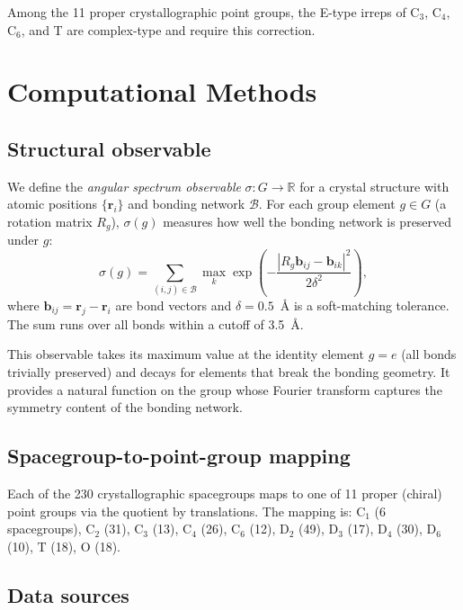 \documentclass[aps,prb,twocolumn,superscriptaddress]{revtex4-2}
\newcommand{\RR}{\mathbb{R}}
\begin{document}
Among the 11 proper crystallographic point groups, the E-type irreps
of C$_3$, C$_4$, C$_6$, and T are complex-type and require this
correction.

\section{Computational Methods}
\label{sec:methods}

\subsection{Structural observable}

We define the \emph{angular spectrum observable} $\sigma : G \to \RR$
for a crystal structure with atomic positions
$\{\mathbf{r}_i\}$ and bonding network $\mathcal{B}$. For each group
element $g \in G$ (a rotation matrix $R_g$), $\sigma(g)$ measures
how well the bonding network is preserved under $g$:
\begin{equation}
  \sigma(g) = \sum_{(i,j) \in \mathcal{B}} \max_k
    \exp\!\left(-\frac{|R_g \mathbf{b}_{ij} - \mathbf{b}_{ik}|^2}{2\delta^2}\right),
\end{equation}
where $\mathbf{b}_{ij} = \mathbf{r}_j - \mathbf{r}_i$ are bond
vectors and $\delta = 0.5$~\AA{} is a soft-matching tolerance. The
sum runs over all bonds within a cutoff of 3.5~\AA.

This observable takes its maximum value at the identity element
$g = e$ (all bonds trivially preserved) and decays for elements
that break the bonding geometry. It provides a natural function on
the group whose Fourier transform captures the symmetry content
of the bonding network.

\subsection{Spacegroup-to-point-group mapping}

Each of the 230 crystallographic spacegroups maps to one of 11 proper
(chiral) point groups via the quotient by translations. The mapping
is: C$_1$ (6 spacegroups), C$_2$ (31), C$_3$ (13), C$_4$ (26),
C$_6$ (12), D$_2$ (49), D$_3$ (17), D$_4$ (30), D$_6$ (10),
T (18), O (18).

\subsection{Data sources}
\end{document}
